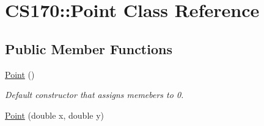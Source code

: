 \hypertarget{class_c_s170_1_1_point}{\section{C\-S170\-:\-:Point Class Reference}
\label{class_c_s170_1_1_point}
}
\subsection*{Public Member Functions}
\begin{DoxyCompactItemize}
\item 
\hypertarget{class_c_s170_1_1_point_a414176fbfb78f06d61aedd4a39177975}{\hyperlink{class_c_s170_1_1_point_a414176fbfb78f06d61aedd4a39177975}{Point} ()}\label{class_c_s170_1_1_point_a414176fbfb78f06d61aedd4a39177975}

\begin{DoxyCompactList}\small\item\em Default constructor that assigns memebers to 0. \end{DoxyCompactList}\item 
\hypertarget{class_c_s170_1_1_point_a2a6badab5911c9493b6f37430e937d67}{\hyperlink{class_c_s170_1_1_point_a2a6badab5911c9493b6f37430e937d67}{Point} (double x, double y)}\label{class_c_s170_1_1_point_a2a6badab5911c9493b6f37430e937d67}


\end{DoxyCompactItemize}
